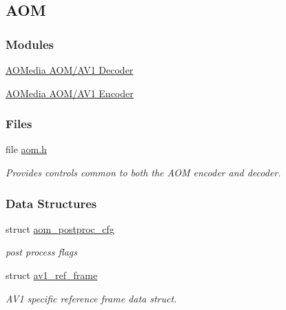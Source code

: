 \hypertarget{group__aom}{}\subsection{A\+OM}
\label{group__aom}
\subsubsection*{Modules}
\begin{DoxyCompactItemize}
\item 
\hyperlink{group__aom__decoder}{A\+O\+Media A\+O\+M/\+A\+V1 Decoder}
\item 
\hyperlink{group__aom__encoder}{A\+O\+Media A\+O\+M/\+A\+V1 Encoder}
\end{DoxyCompactItemize}
\subsubsection*{Files}
\begin{DoxyCompactItemize}
\item 
file \hyperlink{aom_8h}{aom.\+h}
\begin{DoxyCompactList}\small\item\em Provides controls common to both the A\+OM encoder and decoder. \end{DoxyCompactList}\end{DoxyCompactItemize}
\subsubsection*{Data Structures}
\begin{DoxyCompactItemize}
\item 
struct \hyperlink{structaom__postproc__cfg}{aom\+\_\+postproc\+\_\+cfg}
\begin{DoxyCompactList}\small\item\em post process flags \end{DoxyCompactList}\item 
struct \hyperlink{structav1__ref__frame}{av1\+\_\+ref\+\_\+frame}
\begin{DoxyCompactList}\small\item\em A\+V1 specific reference frame data struct. \end{DoxyCompactList}\end{DoxyCompactItemize}
